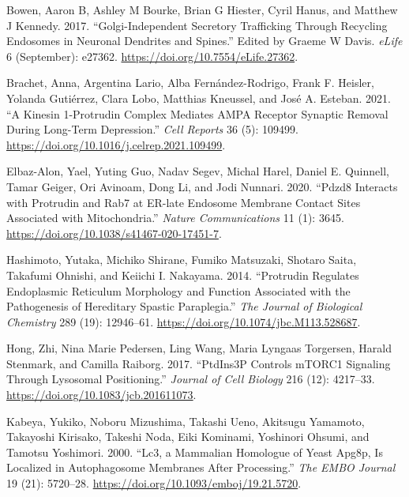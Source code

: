 \documentclass[
]{article}
\newlength{\cslhangindent}
\newlength{\cslentryspacingunit} %
\newenvironment{CSLReferences}[2] %
 {%
  \setlength{\parindent}{0pt}
  \ifodd #1
  \let\oldpar\par
  \def\par{\hangindent=\cslhangindent\oldpar}
  \fi
  \setlength{\parskip}{#2\cslentryspacingunit}
 }%
 {}
\begin{document}
\hypertarget{refs}{}
\begin{CSLReferences}{1}{0}
\leavevmode{}%
Bowen, Aaron B, Ashley M Bourke, Brian G Hiester, Cyril Hanus, and
Matthew J Kennedy. 2017. {``Golgi-Independent Secretory Trafficking
Through Recycling Endosomes in Neuronal Dendrites and Spines.''} Edited
by Graeme W Davis. \emph{eLife} 6 (September): e27362.
\url{https://doi.org/10.7554/eLife.27362}.

\leavevmode{}%
Brachet, Anna, Argentina Lario, Alba Fernández-Rodrigo, Frank F.
Heisler, Yolanda Gutiérrez, Clara Lobo, Matthias Kneussel, and José A.
Esteban. 2021. {``A Kinesin 1-Protrudin Complex Mediates {AMPA} Receptor
Synaptic Removal During Long-Term Depression.''} \emph{Cell Reports} 36
(5): 109499. \url{https://doi.org/10.1016/j.celrep.2021.109499}.

\leavevmode{}%
Elbaz-Alon, Yael, Yuting Guo, Nadav Segev, Michal Harel, Daniel E.
Quinnell, Tamar Geiger, Ori Avinoam, Dong Li, and Jodi Nunnari. 2020.
{``{Pdzd8} Interacts with {Protrudin} and {Rab7} at {ER-late} Endosome
Membrane Contact Sites Associated with Mitochondria.''} \emph{Nature
Communications} 11 (1): 3645.
\url{https://doi.org/10.1038/s41467-020-17451-7}.

\leavevmode{}%
Hashimoto, Yutaka, Michiko Shirane, Fumiko Matsuzaki, Shotaro Saita,
Takafumi Ohnishi, and Keiichi I. Nakayama. 2014. {``Protrudin Regulates
Endoplasmic Reticulum Morphology and Function Associated with the
Pathogenesis of Hereditary Spastic Paraplegia.''} \emph{The Journal of
Biological Chemistry} 289 (19): 12946--61.
\url{https://doi.org/10.1074/jbc.M113.528687}.

\leavevmode{}%
Hong, Zhi, Nina Marie Pedersen, Ling Wang, Maria Lyngaas Torgersen,
Harald Stenmark, and Camilla Raiborg. 2017. {``{PtdIns3P} Controls
{mTORC1} Signaling Through Lysosomal Positioning.''} \emph{Journal of
Cell Biology} 216 (12): 4217--33.
\url{https://doi.org/10.1083/jcb.201611073}.

\leavevmode{}%
Kabeya, Yukiko, Noboru Mizushima, Takashi Ueno, Akitsugu Yamamoto,
Takayoshi Kirisako, Takeshi Noda, Eiki Kominami, Yoshinori Ohsumi, and
Tamotsu Yoshimori. 2000. {``{Lc3}, a Mammalian Homologue of Yeast
{Apg8p}, Is Localized in Autophagosome Membranes After Processing.''}
\emph{The EMBO Journal} 19 (21): 5720--28.
\url{https://doi.org/10.1093/emboj/19.21.5720}.


\end{CSLReferences}
\end{document}
